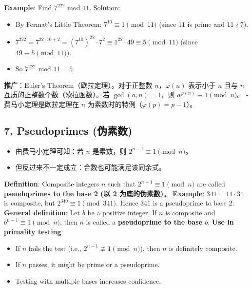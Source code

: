 \documentclass[10pt,a4paper,openany]{ctexbook}
\theoremstyle{definition}
\theoremstyle{remark}
\renewenvironment{quote}
  {\list{}{\leftmargin=1em\rightmargin=0pt\topsep=0.5pt\partopsep=0pt}\item[]}
  {\endlist}
\begin{document}
\textbf{Example}: Find $7^{222} \text{ mod } 11$.
Solution:
\begin{itemize}
\item By Fermat's Little Theorem: $7^{10} \equiv 1 \pmod{11}$ (since $11$ is prime and $11 \nmid 7$).
\item $7^{222} = 7^{22 \cdot 10 + 2} = (7^{10})^{22} \cdot 7^2 \equiv 1^{22} \cdot 49 \equiv 5 \pmod{11}$ (since $49 \equiv 5 \pmod{11}$).
\item So $7^{222} \text{ mod } 11 = 5$.

\end{itemize}

\begin{quote}
\textbf{推广}：Euler's Theorem（欧拉定理）。对于正整数 $n$，$\varphi(n)$ 表示小于 $n$ 且与 $n$ 互质的正整数个数（欧拉函数）。若 $\gcd(a, n) = 1$，则 $a^{\varphi(n)} \equiv 1 \pmod{n}$。
- 费马小定理是欧拉定理在 $n$ 为素数时的特例（$\varphi(p) = p-1$）。

\end{quote}
\vspace{-2pt}

\subsection{7. Pseudoprimes (伪素数)}

\begin{itemize}
\item 由费马小定理可知：若 $n$ 是素数，则 $2^{n-1} \equiv 1 \pmod{n}$。
\item 但反过来不一定成立：合数也可能满足该同余式。

\end{itemize}

\textbf{Definition}: Composite integers $n$ such that $2^{n-1} \equiv 1 \pmod{n}$ are called \textbf{pseudoprimes to the base 2 (以 2 为底的伪素数)}。
\textbf{Example}: $341 = 11 \cdot 31$ is composite, but $2^{340} \equiv 1 \pmod{341}$. Hence $341$ is a pseudoprime to base 2.
\textbf{General definition}: Let $b$ be a positive integer. If $n$ is composite and $b^{n-1} \equiv 1 \pmod{n}$, then $n$ is called a \textbf{pseudoprime to the base $b$}.
\textbf{Use in primality testing}:
\begin{itemize}
\item If $n$ fails the test (i.e., $2^{n-1} \not\equiv 1 \pmod{n}$), then $n$ is definitely composite.
\item If $n$ passes, it might be prime or a pseudoprime.
\item Testing with multiple bases increases confidence.

\end{itemize}
\end{document}
